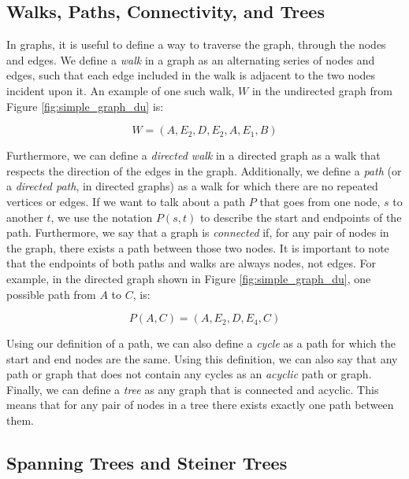 \documentclass[12pt,twoside]{reedthesis}
\theoremstyle{definition}
\begin{document}
   \subsection{Walks, Paths, Connectivity, and Trees}

   In graphs, it is useful to define a way to traverse the graph, through the nodes and edges. We define a \textit{walk} in a graph as an alternating series of nodes and edges, such that each edge included in the walk is adjacent to the two nodes incident upon it. An example of one such walk, $W$ in the undirected graph from Figure \ref{fig:simple_graph_du} is:\par

   \begin{equation*}
     W = (A,E_2,D,E_2,A,E_1,B)
   \end{equation*}

   Furthermore, we can define a \textit{directed walk} in a directed graph as a walk that respects the direction of the edges in the graph. Additionally, we define a \textit{path} (or a \textit{directed path}, in directed graphs) as a walk for which there are no repeated vertices or edges. If we want to talk about a path $P$ that goes from one node, $s$ to another $t$, we use the notation $P(s,t)$ to describe the start and endpoints of the path. Furthermore, we say that a graph is \textit{connected} if, for any pair of nodes in the graph, there exists a path between those two nodes. It is important to note that the endpoints of both paths and walks are always nodes, not edges. For example, in the directed graph shown in Figure \ref{fig:simple_graph_du}, one possible path from $A$ to $C$, is:\par

   \begin{equation*}
     P(A,C) = (A,E_2,D,E_4,C)
   \end{equation*}

   Using our definition of a path, we can also define a \textit{cycle} as a path for which the start and end nodes are the same. Using this definition, we can also say that any path or graph that does not contain any cycles as an \textit{acyclic} path or graph. Finally, we can define a \textit{tree} as any graph that is connected and acyclic. This means that for any pair of nodes in a tree there exists exactly one path between them.\par

   \subsection{Spanning Trees and Steiner Trees}
\end{document}
